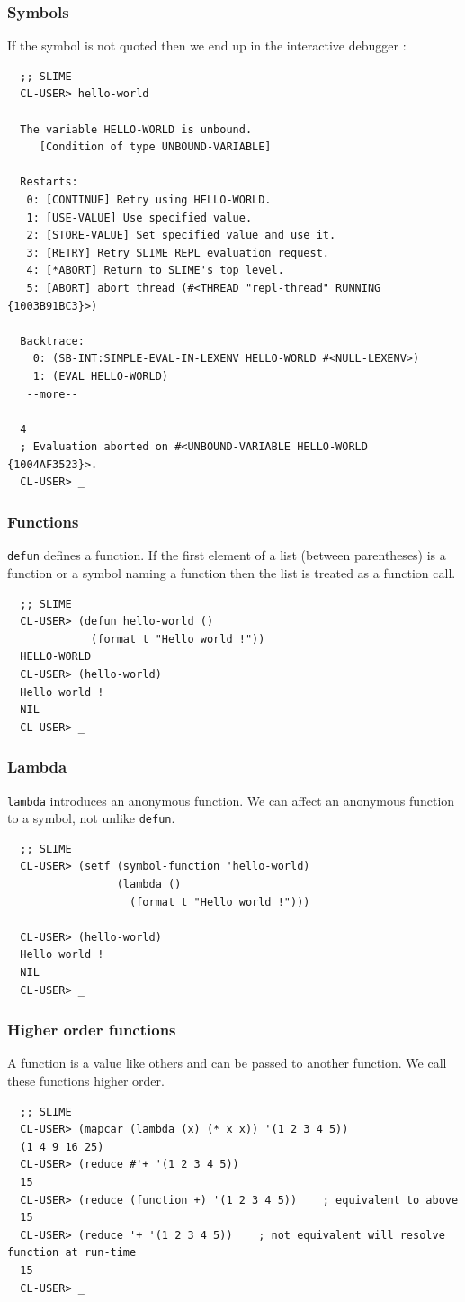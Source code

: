 \documentclass[8pt]{beamer}
\begin{document}
\begin{frame}[fragile]
  \frametitle{Symbols}
  If the symbol is not quoted then we end up in the interactive debugger :
\begin{verbatim}
  ;; SLIME
  CL-USER> hello-world
  
  The variable HELLO-WORLD is unbound.
     [Condition of type UNBOUND-VARIABLE]
  
  Restarts:
   0: [CONTINUE] Retry using HELLO-WORLD.
   1: [USE-VALUE] Use specified value.
   2: [STORE-VALUE] Set specified value and use it.
   3: [RETRY] Retry SLIME REPL evaluation request.
   4: [*ABORT] Return to SLIME's top level.
   5: [ABORT] abort thread (#<THREAD "repl-thread" RUNNING {1003B91BC3}>)
  
  Backtrace:
    0: (SB-INT:SIMPLE-EVAL-IN-LEXENV HELLO-WORLD #<NULL-LEXENV>)
    1: (EVAL HELLO-WORLD)
   --more--
  
  4
  ; Evaluation aborted on #<UNBOUND-VARIABLE HELLO-WORLD {1004AF3523}>.
  CL-USER> _
\end{verbatim}
\end{frame}

\begin{frame}[fragile]
  \frametitle{Functions}
  {\tt defun} defines a function.
  If the first element of a list (between parentheses) is a function or a symbol naming a function then the list is treated as a function call.
\begin{verbatim}
  ;; SLIME
  CL-USER> (defun hello-world ()
             (format t "Hello world !"))
  HELLO-WORLD
  CL-USER> (hello-world)
  Hello world !
  NIL
  CL-USER> _
\end{verbatim}
\end{frame}

\begin{frame}[fragile]
  \frametitle{Lambda}
  {\tt lambda} introduces an anonymous function. We can affect an anonymous function to a symbol, not unlike {\tt defun}.
\begin{verbatim}
  ;; SLIME
  CL-USER> (setf (symbol-function 'hello-world)
                 (lambda ()
                   (format t "Hello world !")))
  
  CL-USER> (hello-world)
  Hello world !
  NIL
  CL-USER> _
\end{verbatim}
\end{frame}

\begin{frame}[fragile]
  \frametitle{Higher order functions}
  A function is a value like others and can be passed to another function. We call these functions higher order.
\begin{verbatim}
  ;; SLIME
  CL-USER> (mapcar (lambda (x) (* x x)) '(1 2 3 4 5))
  (1 4 9 16 25)
  CL-USER> (reduce #'+ '(1 2 3 4 5))
  15
  CL-USER> (reduce (function +) '(1 2 3 4 5))    ; equivalent to above
  15
  CL-USER> (reduce '+ '(1 2 3 4 5))    ; not equivalent will resolve function at run-time
  15
  CL-USER> _
\end{verbatim}
\end{frame}
\end{document}
